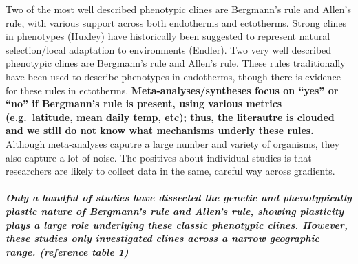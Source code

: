\documentclass[]{article}
\let\oldsubparagraph\subparagraph
\renewcommand{\subparagraph}[1]{\oldsubparagraph{#1}\mbox{}}
\begin{document}
Two of the most well described phenotypic clines are Bergmann's rule and
Allen's rule, with various support across both endotherms and
ectotherms. Strong clines in phenotypes (Huxley) have historically been
suggested to represent natural selection/local adaptation to
environments (Endler). Two very well described phenotypic clines are
Bergmann's rule and Allen's rule. These rules traditionally have been
used to describe phenotypes in endotherms, though there is evidence for
these rules in ectotherms. \textbf{Meta-analyses/syntheses focus on
``yes'' or ``no'' if Bergmann's rule is present, using various metrics
(e.g.~latitude, mean daily temp, etc); thus, the literautre is clouded
and we still do not know what mechanisms underly these rules.} Although
meta-analyses caputre a large number and variety of organisms, they also
capture a lot of noise. The positives about individual studies is that
researchers are likely to collect data in the same, careful way across
gradients.

\hypertarget{only-a-handful-of-studies-have-dissected-the-genetic-and-phenotypically-plastic-nature-of-bergmanns-rule-and-allens-rule-showing-plasticity-plays-a-large-role-underlying-these-classic-phenotypic-clines.-however-these-studies-only-investigated-clines-across-a-narrow-geographic-range.-reference-table-1}{%
\subparagraph{\texorpdfstring{\textbf{Only a handful of studies have
dissected the genetic and phenotypically plastic nature of Bergmann's
rule and Allen's rule, showing plasticity plays a large role underlying
these classic phenotypic clines. However, these studies only
investigated clines across a narrow geographic range.} (reference table
1)}{Only a handful of studies have dissected the genetic and phenotypically plastic nature of Bergmann's rule and Allen's rule, showing plasticity plays a large role underlying these classic phenotypic clines. However, these studies only investigated clines across a narrow geographic range. (reference table 1)}}\label{only-a-handful-of-studies-have-dissected-the-genetic-and-phenotypically-plastic-nature-of-bergmanns-rule-and-allens-rule-showing-plasticity-plays-a-large-role-underlying-these-classic-phenotypic-clines.-however-these-studies-only-investigated-clines-across-a-narrow-geographic-range.-reference-table-1}}
\end{document}
